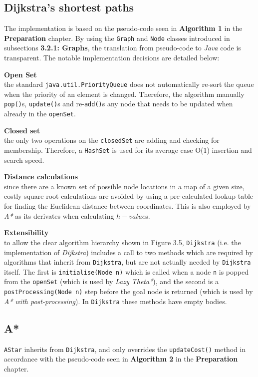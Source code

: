 \documentclass[12pt,notitlepage]{report}
\begin{document}
\subsection{Dijkstra's shortest paths}
The implementation is based on the pseudo-code seen in {\bfseries Algorithm 1} in the {\bfseries Preparation} chapter. By using the {\tt Graph} and {\tt Node} classes introduced in subsections {\bfseries 3.2.1: Graphs}, the translation from pseudo-code to {\em Java} code is transparent. The notable implementation decisions are detailed below:
\begin{description}
  \item {\bf Open Set}\\ \hfill
  the standard {\tt java.util.PriorityQueue} does not automatically re-sort the queue when the priority of an element is changed. Therefore, the algorithm manually {\tt pop()}s, {\tt update()}s and re-{\tt add()}s any node that needs to be updated when already in the {\tt openSet}.
  \item {\bf Closed set}\\ \hfill
  the only two operations on the {\tt closedSet} are adding and checking for membership. Therefore, a {\tt HashSet} is used for its average case O(1) insertion and search speed.
  \item {\bf Distance calculations}\\ \hfill
  since there are a known set of possible node locations in a map of a given size, costly square root calculations are avoided by using a pre-calculated lookup table for finding the Euclidean distance between coordinates. This is also employed by {\em A*} as its derivates when calculating $h-value$s.
  \item {\bf Extensibility} \\ \hfill
  to allow the clear algorithm hierarchy shown in Figure 3.5, {\tt Dijkstra} (i.e. the implementation of {\em Dijkstra}) includes a call to two methods which are required by algorithms that inherit from {\tt Dijkstra}, but are not actually needed by {\tt Dijkstra} itself. The first is {\tt initialise(Node n)} which is called when a node {\tt n} is popped from the {\tt openSet} (which is used by {\em Lazy Theta*}), and the second is a {\tt postProcessing(Node n)} step before the goal node is returned (which is used by {\em A* with post-processing}). In {\tt Dijkstra}  these methods have empty bodies.
  \end{description}

\subsection{A*}
{\tt AStar} inherits from {\tt Dijkstra}, and only overrides the {\tt updateCost()} method in accordance with the pseudo-code seen in {\bfseries Algorithm 2} in the {\bfseries Preparation} chapter. 
\end{document}
